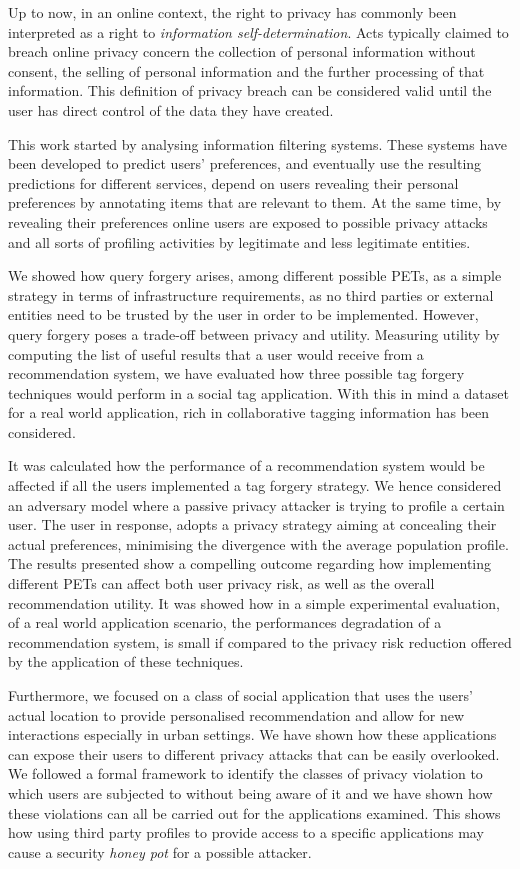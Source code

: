 Up to now, in an online context, the right to privacy has commonly been interpreted as a right to \emph{information self-determination}. Acts typically claimed to breach online privacy concern the collection of personal information without consent, the selling of personal information and the further processing of that information. This definition of privacy breach can be considered valid until the user has direct control of the data they have created.

This work started by analysing information filtering systems. These systems have been developed to predict users' preferences, and eventually use the resulting predictions for different services, depend on users revealing their personal preferences by annotating items that are relevant to them.  At the same time, by revealing their preferences online users are exposed to possible privacy attacks and all sorts of profiling activities by legitimate and less legitimate entities.

We showed how query forgery arises, among different possible PETs, as a simple strategy in terms of infrastructure requirements, as no third parties or external entities need to be trusted by the user in order to be implemented. However, query forgery poses a trade-off between privacy and utility. Measuring utility by computing the list of useful results that a user would receive from a recommendation system, we have evaluated how three possible tag forgery techniques would perform in a social tag application. With this in mind a dataset for a real world application, rich in collaborative tagging information has been considered.

It was calculated how the performance of a recommendation system would be affected if all the users implemented a tag forgery strategy. We hence considered an adversary model where a passive privacy attacker is trying to profile a certain user. The user in response, adopts a privacy strategy aiming at concealing their actual preferences, minimising the divergence with the average population profile. The results presented show a compelling outcome regarding how implementing different PETs can affect both user privacy risk, as well as the overall recommendation utility. It was showed how in a simple experimental evaluation, of a real world application scenario, the performances degradation of a recommendation system, is small if compared to the privacy risk reduction offered by the application of these techniques.

Furthermore, we focused on a class of social application that uses the users' actual location to provide personalised recommendation and allow for new interactions especially in urban settings. We have shown how these applications can expose their users to different privacy attacks that can be easily overlooked. We followed a formal framework to identify the classes of privacy violation to which users are subjected to without being aware of it and we have shown how these violations can all be carried out for the applications examined. This shows how using third party profiles to provide access to a specific applications may cause a security \emph{honey pot} for a possible attacker.

